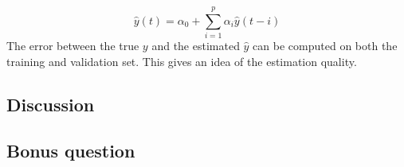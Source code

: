 \documentclass[11pt]{article}
\begin{document}
\begin{equation*}
    \hat{y}(t)=\alpha_0+\sum_{i=1}^p \alpha_i\hat{y}(t-i)
\end{equation*}
The error between the true $y$ and the estimated $\hat{y}$ can be computed on both the training and validation set. This gives an idea of the estimation quality.\\

\subsection*{Discussion}
\subsection*{Bonus question}
\end{document}
